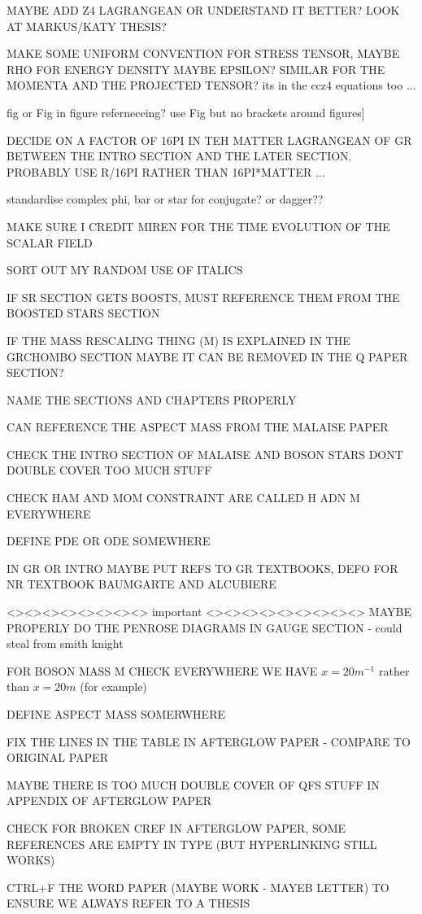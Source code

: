 \documentclass[11pt]{report}  %
\numberwithin{equation}{section}
\begin{document}
MAYBE ADD Z4 LAGRANGEAN OR UNDERSTAND IT BETTER? LOOK AT MARKUS/KATY THESIS?

MAKE SOME UNIFORM CONVENTION FOR STRESS TENSOR, MAYBE RHO FOR ENERGY DENSITY MAYBE EPSILON? SIMILAR FOR THE MOMENTA AND THE PROJECTED TENSOR? its in the ccz4 equations too ...

fig or Fig in figure referneceing? use Fig but no brackets around figures]

DECIDE ON A FACTOR OF 16PI IN TEH MATTER LAGRANGEAN OF GR BETWEEN THE INTRO SECTION AND THE LATER SECTION. PROBABLY USE R/16PI RATHER THAN 16PI*MATTER ... 

standardise complex phi, bar or star for conjugate? or dagger??

MAKE SURE I CREDIT MIREN FOR THE TIME EVOLUTION OF THE SCALAR FIELD

SORT OUT MY RANDOM USE OF ITALICS

IF SR SECTION GETS BOOSTS, MUST REFERENCE THEM FROM THE BOOSTED STARS SECTION

IF THE MASS RESCALING THING (M) IS EXPLAINED IN THE GRCHOMBO SECTION MAYBE IT CAN BE REMOVED IN THE Q PAPER SECTION?

NAME THE SECTIONS AND CHAPTERS PROPERLY

CAN REFERENCE THE ASPECT MASS FROM THE MALAISE PAPER

CHECK THE INTRO SECTION OF MALAISE AND BOSON STARS DONT DOUBLE COVER TOO MUCH STUFF

CHECK HAM AND MOM CONSTRAINT ARE CALLED H ADN M EVERYWHERE

DEFINE PDE OR ODE SOMEWHERE

IN GR OR INTRO MAYBE PUT REFS TO GR TEXTBOOKS, DEFO FOR NR TEXTBOOK BAUMGARTE AND ALCUBIERE

<><><><><><><><> important <><><><><><><><><>
MAYBE PROPERLY DO THE PENROSE DIAGRAMS IN GAUGE SECTION - could steal from smith knight

FOR BOSON MASS M CHECK EVERYWHERE WE HAVE   $x = 20 m^{-1}$ rather than $x = 20 m$ (for example) 

DEFINE ASPECT MASS SOMERWHERE 

FIX THE LINES IN THE TABLE IN AFTERGLOW PAPER - COMPARE TO ORIGINAL PAPER

MAYBE THERE IS TOO MUCH DOUBLE COVER OF QFS STUFF IN APPENDIX OF AFTERGLOW PAPER

CHECK FOR BROKEN CREF IN AFTERGLOW PAPER, SOME REFERENCES ARE EMPTY IN TYPE (BUT HYPERLINKING STILL WORKS)

CTRL+F THE WORD PAPER (MAYBE WORK - MAYEB LETTER) TO ENSURE WE ALWAYS REFER TO A THESIS
\end{document}
